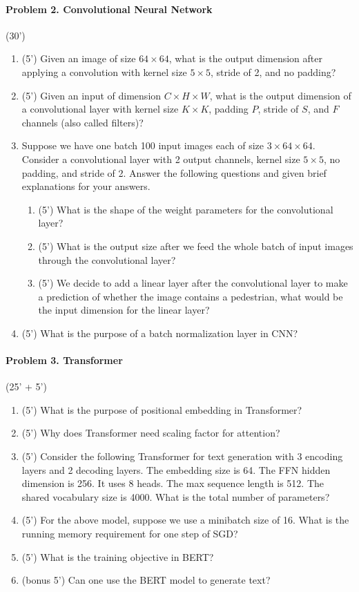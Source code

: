 \documentclass[11pt]{article}\pagestyle{plain}
\begin{document}
\paragraph{Problem 2. Convolutional Neural Network} (30')
\begin{enumerate}
	\item (5') Given an image of size $64\times 64$, what is the output dimension after applying a convolution with kernel size $5\times 5$, stride of 2, and no padding?
	
	\item (5') Given an input of dimension $C\times H\times W$, what is the output dimension of a convolutional layer with kernel size $K\times K$, padding $P$, stride of $S$, and $F$ channels (also called filters)?
	
	\item Suppose we have one batch 100 input images each of size $3\times 64\times 64$. Consider a convolutional layer with 2 output channels, kernel size $5\times 5$, no padding, and stride of 2. Answer the following questions and given brief explanations for your answers.
	
	\begin{enumerate}
		\item (5') What is the shape of the weight parameters for the convolutional layer?
		\item (5') What is the output size after we feed the whole batch of input images through the convolutional layer?
		\item (5') We decide to add a linear layer after the convolutional layer to make a prediction of whether the image contains a pedestrian, what would be the input dimension for the linear layer?
 	\end{enumerate}
 
 	\item (5') What is the purpose of a batch normalization layer in CNN?
\end{enumerate}


\paragraph{Problem 3. Transformer} (25' + 5')
\begin{enumerate}
	\item (5') What is the purpose of positional embedding in Transformer?
	\item (5') Why does Transformer need scaling factor for attention?
	\item (5') Consider the following Transformer for text generation with 3 encoding layers and 2 decoding layers. The embedding size is 64. The FFN hidden dimension is 256. It uses 8 heads. The max sequence length is 512. The shared vocabulary size is 4000. What is the total number of parameters? 
	\item (5') For the above model, suppose we use a minibatch size of 16. What is the running memory requirement for one step of SGD?
	\item (5') What is the training objective in BERT?
	\item (bonus 5') Can one use the BERT model to generate text? 
\end{enumerate}
\end{document}

